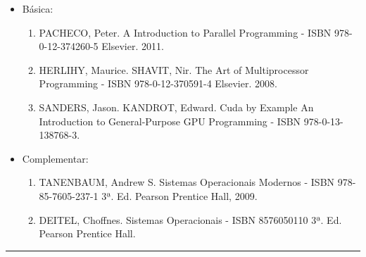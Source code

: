 \begin{itemize} 
  \item Básica:
	\begin{enumerate}
	\item PACHECO, Peter. A Introduction to Parallel Programming - ISBN 978-0-12-374260-5 Elsevier. 2011.
	\item HERLIHY, Maurice. SHAVIT, Nir. The Art of Multiprocessor Programming - ISBN 978-0-12-370591-4 Elsevier. 2008.
	\item SANDERS, Jason. KANDROT, Edward. Cuda by Example An Introduction to General-Purpose GPU Programming - ISBN 978-0-13-138768-3.
	\end{enumerate}
  \item Complementar:
	\begin{enumerate} 
	\item  TANENBAUM, Andrew S. Sistemas Operacionais Modernos - ISBN 978-85-7605-237-1 3ª. Ed. Pearson Prentice Hall, 2009.
	\item  DEITEL, Choffnes. Sistemas Operacionais - ISBN 8576050110 3ª. Ed. Pearson Prentice Hall. 
	\end{enumerate}
\end{itemize}
\noindent\rule{16.5cm}{0.4pt}\\
\\
